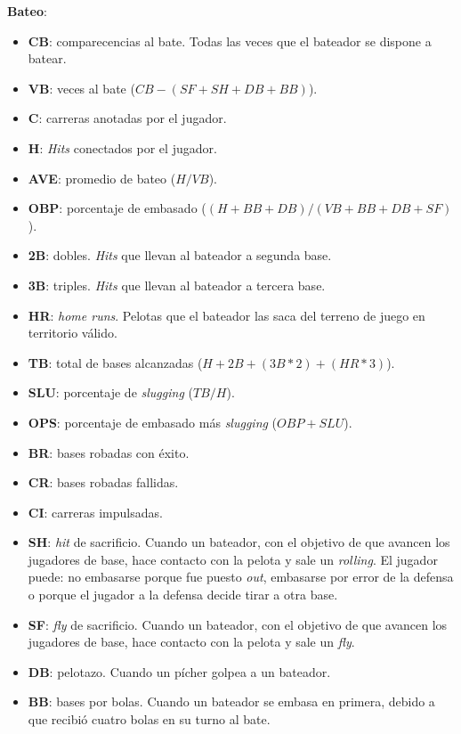 \large{\textbf{Bateo}:}
\normalsize
\begin{itemize}
		\setlength\itemsep{0em}
	\item \textbf{CB}: comparecencias al bate. Todas las veces que el bateador se dispone a batear.
	\item \textbf{VB}: veces al bate ($ CB - (SF + SH + DB + BB)$).
	\item \textbf{C}: carreras anotadas por el jugador.
	\item \textbf{H}: \textit{Hits} conectados por el jugador.
	\item \textbf{AVE}: promedio de bateo ($ H/VB $).
	\item \textbf{OBP}: porcentaje de embasado ($(H + BB + DB) / (VB + BB + DB + SF)$).
	\item \textbf{2B}: dobles. \textit{Hits} que llevan al bateador a segunda base.
	\item \textbf{3B}: triples. \textit{Hits} que llevan al bateador a tercera base.
	\item \textbf{HR}: \textit{home runs}. Pelotas que el bateador las saca del terreno de juego en territorio válido.
	\item \textbf{TB}: total de bases alcanzadas ($H+2B+(3B*2)+(HR*3)$).
	\item \textbf{SLU}: porcentaje de \textit{slugging} ($ TB / H $).
	\item \textbf{OPS}: porcentaje de embasado más \textit{slugging} ($ OBP + SLU $).
	\item \textbf{BR}: bases robadas con éxito.
	\item \textbf{CR}: bases robadas fallidas.
	\item \textbf{CI}: carreras impulsadas.
	\item \textbf{SH}: \textit{hit} de sacrificio. Cuando un bateador, con el objetivo de que avancen los jugadores de base, hace contacto con la pelota y sale un \textit{rolling}. El jugador puede: no embasarse porque fue puesto \textit{out}, embasarse por error de la defensa o porque el jugador a la defensa decide tirar a otra base.
	\item \textbf{SF}: \textit{fly} de sacrificio. Cuando un bateador, con el objetivo de que avancen los jugadores de base, hace contacto con la pelota y sale un \textit{fly}.
	\item \textbf{DB}: pelotazo. Cuando un pícher golpea a un bateador.
	\item \textbf{BB}: bases por bolas. Cuando un bateador se embasa en primera, debido a que recibió cuatro bolas en su turno al bate.

\end{itemize}
